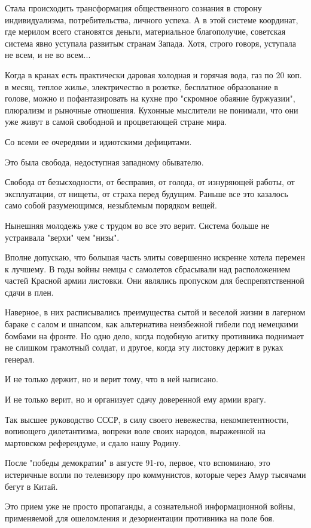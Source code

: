 \documentclass[a4paper,11pt]{extreport}
\begin{document}
Стала происходить трансформация общественного сознания в сторону
индивидуализма, потребительства, личного успеха. А в этой системе координат,
где мерилом всего становятся деньги, материальное благополучие, советская
система явно уступала развитым странам Запада. Хотя, строго говоря, уступала не
всем, и не во всем...

Когда в кранах есть практически даровая холодная и горячая вода, газ по 20 коп.
в месяц, теплое жилье, электричество в розетке, бесплатное образование в
голове, можно и пофантазировать на кухне про "скромное обаяние буржуазии",
плюрализм и рыночные отношения. Кухонные мыслители не понимали, что они уже
живут в самой свободной и процветающей стране мира.

Со всеми ее очередями и идиотскими дефицитами.

Это была свобода, недоступная западному обывателю.

Свобода от безысходности, от бесправия, от голода, от изнуряющей работы, от
эксплуатации, от нищеты, от страха перед будущим. Раньше все это казалось само
собой разумеющимся, незыблемым порядком вещей.

Нынешняя молодежь уже с трудом во все это верит. Система больше не устраивала
"верхи" чем "низы".

Вполне допускаю, что большая часть элиты совершенно искренне хотела перемен к
лучшему. В годы войны немцы с самолетов сбрасывали над расположением частей
Красной армии листовки. Они являлись пропуском для беспрепятственной сдачи в
плен.

Наверное, в них расписывались преимущества сытой и веселой жизни в лагерном
бараке с салом и шнапсом, как альтернатива неизбежной гибели под немецкими
бомбами на фронте. Но одно дело, когда подобную агитку противника поднимает не
слишком грамотный солдат, и другое, когда эту листовку держит в руках генерал.

И не только держит, но и верит тому, что в ней написано.

И не только верит, но и организует сдачу доверенной ему армии врагу.

Так высшее руководство СССР, в силу своего невежества, некомпетентности,
вопиющего дилетантизма, вопреки воле своих народов, выраженной на мартовском
референдуме, и сдало нашу Родину.

После "победы демократии" в августе 91-го, первое, что вспоминаю, это
истеричные вопли по телевизору про коммунистов, которые через Амур тысячами
бегут в Китай.

Это прием уже не просто пропаганды, а сознательной информационной войны,
применяемой для ошеломления и дезориентации противника на поле боя.
\end{document}
